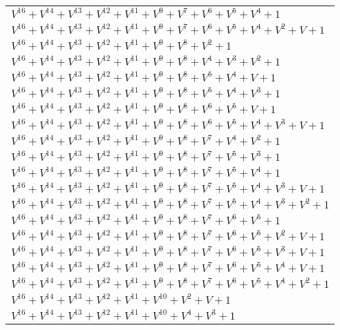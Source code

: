 \documentclass[12pt]{article}
\begin{document}
\begin{adjustwidth}{-4cm}{}
\begin{center}
\begin{longtable}{|l|}
$V^{16}  +V^{14}  +V^{13}  +V^{12}  +V^{11}  +V^{9}  +V^{7}  +V^{6}  +V^{5}  +V^{4}  + 1$ \\
$V^{16}  +V^{14}  +V^{13}  +V^{12}  +V^{11}  +V^{9}  +V^{7}  +V^{6}  +V^{5}  +V^{4}  +V^{2}  + V + 1$ \\
$V^{16}  +V^{14}  +V^{13}  +V^{12}  +V^{11}  +V^{9}  +V^{8}  +V^{2}  + 1$ \\
$V^{16}  +V^{14}  +V^{13}  +V^{12}  +V^{11}  +V^{9}  +V^{8}  +V^{4}  +V^{3}  +V^{2}  + 1$ \\
$V^{16}  +V^{14}  +V^{13}  +V^{12}  +V^{11}  +V^{9}  +V^{8}  +V^{5}  +V^{4}  + V + 1$ \\
$V^{16}  +V^{14}  +V^{13}  +V^{12}  +V^{11}  +V^{9}  +V^{8}  +V^{5}  +V^{4}  +V^{3}  + 1$ \\
$V^{16}  +V^{14}  +V^{13}  +V^{12}  +V^{11}  +V^{9}  +V^{8}  +V^{6}  +V^{5}  + V + 1$ \\
$V^{16}  +V^{14}  +V^{13}  +V^{12}  +V^{11}  +V^{9}  +V^{8}  +V^{6}  +V^{5}  +V^{4}  +V^{3}  + V + 1$ \\
$V^{16}  +V^{14}  +V^{13}  +V^{12}  +V^{11}  +V^{9}  +V^{8}  +V^{7}  +V^{4}  +V^{2}  + 1$ \\
$V^{16}  +V^{14}  +V^{13}  +V^{12}  +V^{11}  +V^{9}  +V^{8}  +V^{7}  +V^{5}  +V^{3}  + 1$ \\
$V^{16}  +V^{14}  +V^{13}  +V^{12}  +V^{11}  +V^{9}  +V^{8}  +V^{7}  +V^{5}  +V^{4}  + 1$ \\
$V^{16}  +V^{14}  +V^{13}  +V^{12}  +V^{11}  +V^{9}  +V^{8}  +V^{7}  +V^{5}  +V^{4}  +V^{3}  + V + 1$ \\
$V^{16}  +V^{14}  +V^{13}  +V^{12}  +V^{11}  +V^{9}  +V^{8}  +V^{7}  +V^{5}  +V^{4}  +V^{3}  +V^{2}  + 1$ \\
$V^{16}  +V^{14}  +V^{13}  +V^{12}  +V^{11}  +V^{9}  +V^{8}  +V^{7}  +V^{6}  +V^{5}  + 1$ \\
$V^{16}  +V^{14}  +V^{13}  +V^{12}  +V^{11}  +V^{9}  +V^{8}  +V^{7}  +V^{6}  +V^{5}  +V^{2}  + V + 1$ \\
$V^{16}  +V^{14}  +V^{13}  +V^{12}  +V^{11}  +V^{9}  +V^{8}  +V^{7}  +V^{6}  +V^{5}  +V^{3}  + V + 1$ \\
$V^{16}  +V^{14}  +V^{13}  +V^{12}  +V^{11}  +V^{9}  +V^{8}  +V^{7}  +V^{6}  +V^{5}  +V^{4}  + V + 1$ \\
$V^{16}  +V^{14}  +V^{13}  +V^{12}  +V^{11}  +V^{9}  +V^{8}  +V^{7}  +V^{6}  +V^{5}  +V^{4}  +V^{2}  + 1$ \\
$V^{16}  +V^{14}  +V^{13}  +V^{12}  +V^{11}  +V^{10}  +V^{2}  + V + 1$ \\
$V^{16}  +V^{14}  +V^{13}  +V^{12}  +V^{11}  +V^{10}  +V^{4}  +V^{3}  + 1$ \\

\end{longtable}
\end{center}
\end{adjustwidth}
\end{document}
